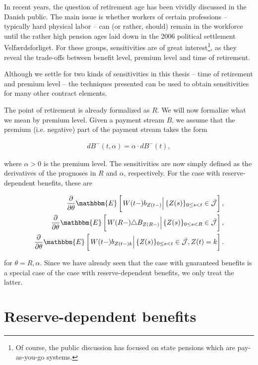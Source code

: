 \documentclass{book}
\newcommand{\1}[1]{\mathbbm{1}_{\left\lbrace #1 \right\rbrace}}
\newcommand{\econd}[2][def]{\mathbbm{E} \left[ \left. #1 \right| #2 \right]}
\theoremstyle{break}
\theoremstyle{remark}
\numberwithin{equation}{section}
\begin{document}
In recent years, the question of retirement age has been vividly discussed in the Danish public. The main issue is whether workers of certain professions -- typically hard physical labor -- can (or rather, should) remain in the workforce until the rather high pension ages laid down in the 2006 political settlement Velfærdsforliget. For these groups, sensitivities are of great interest\footnote{Of course, the public discussion has focused on state pensions which are pay-as-you-go systems.}, as they reveal the trade-offs between benefit level, premium level and time of retirement.

Although we settle for two kinds of sensitivities in this thesis -- time of retirement and premium level -- the techniques presented can be used to obtain sensitivities for many other contract elements.

The point of retirement is already formalized as $R$. We will now formalize what we mean by premium level. Given a payment stream $B$, we assume that the premium (i.e. negative) part of the payment stream takes the form

\begin{align*}
	dB^-(t, \alpha) = \alpha \cdot dB^-(t),
\end{align*}

where $\alpha>0$ is the premium level. The sensitivities are now simply defined as the derivatives of the prognoses in $R$ and $\alpha$, respectively. For the case with reserve-dependent benefits, these are

\begin{align*}
	\frac{\partial}{\partial \theta} \econd[W(t-)b_{Z(t-)}]{\{Z(s) \}_{0 \leq s < t} \in \bar{\mathcal{J}}}, \\
	\frac{\partial}{\partial \theta} \econd[W(R-) \triangle B_{Z(R-)}]{\{Z(s) \}_{0 \leq s < R} \in \bar{\mathcal{J}}}, \\
	\frac{\partial}{\partial \theta} \econd[W(t-)b_{Z(t-)k}]{\{Z(s) \}_{0 \leq s < t} \in \bar{\mathcal{J}}, Z(t) = k}.
\end{align*}

for  $\theta = R,\alpha$. Since we have already seen that the case with guaranteed benefits is a special case of the case with reserve-dependent benefits, we only treat the latter.

\section{Reserve-dependent benefits}
\end{document}
